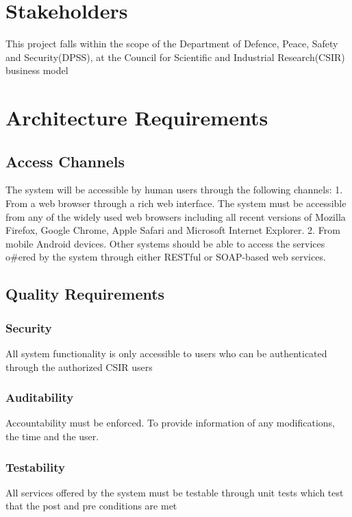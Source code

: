 \documentclass[12pt]{article}
\begin{document}
                \section{Stakeholders}
This project falls within the scope of the Department of Defence, Peace, Safety and Security(DPSS), at the Council for Scientific
and Industrial Research(CSIR) business model
                 
                 \section{Architecture Requirements}
                    \subsection{Access Channels}
The system will be accessible by human users through the following channels:
1. From a web browser through a rich web interface. The system must be accessible from any of
the widely used web browsers including all recent versions of Mozilla Firefox, Google Chrome,
Apple Safari and Microsoft Internet Explorer.
2. From mobile Android devices.
Other systems should be able to access the services o#ered by the system through either RESTful
or SOAP-based web services.
                    
               		\subsection{Quality Requirements}
	                   	\subsubsection{Security }
	                 	All system functionality is only accessible to users who can be authenticated through the
 authorized CSIR users
	                   	\subsubsection{Auditability}
	                   Accountability must be enforced. To provide information   of any modifications, the time and the user.
	                  	\subsubsection{Testability}
All services offered by the system must be testable through unit tests which test that the post and pre conditions are met
\end{document}
